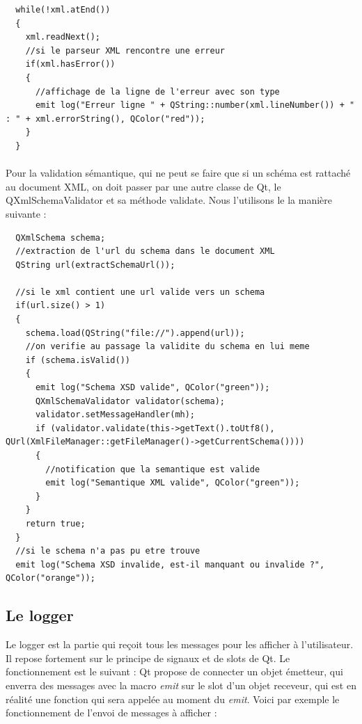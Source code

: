 \begin{lstlisting}
  while(!xml.atEnd())
  {
    xml.readNext();
    //si le parseur XML rencontre une erreur
    if(xml.hasError())
    {
      //affichage de la ligne de l'erreur avec son type
      emit log("Erreur ligne " + QString::number(xml.lineNumber()) + " : " + xml.errorString(), QColor("red"));
    }
  }
\end{lstlisting}
\paragraph{}
Pour la validation sémantique, qui ne peut se faire que si un schéma est rattaché au document XML, on doit passer par une autre classe de Qt, le QXmlSchemaValidator et sa méthode validate. Nous l'utilisons le la manière suivante :
\begin{lstlisting}
  QXmlSchema schema;
  //extraction de l'url du schema dans le document XML
  QString url(extractSchemaUrl());

  //si le xml contient une url valide vers un schema
  if(url.size() > 1)
  {
    schema.load(QString("file://").append(url));
    //on verifie au passage la validite du schema en lui meme
    if (schema.isValid())
    {
      emit log("Schema XSD valide", QColor("green"));
      QXmlSchemaValidator validator(schema);
      validator.setMessageHandler(mh);
      if (validator.validate(this->getText().toUtf8(), QUrl(XmlFileManager::getFileManager()->getCurrentSchema())))
      {
        //notification que la semantique est valide
        emit log("Semantique XML valide", QColor("green"));
      }
    }
    return true;
  }
  //si le schema n'a pas pu etre trouve
  emit log("Schema XSD invalide, est-il manquant ou invalide ?", QColor("orange"));
\end{lstlisting}
\paragraph{}
\subsection{Le logger}
Le logger est la partie qui reçoit tous les messages pour les afficher à l'utilisateur. Il repose fortement sur le principe de signaux et de slots de Qt. Le fonctionnement est le suivant : Qt propose de connecter un objet émetteur, qui enverra des messages avec la macro \textit{emit} sur le slot d'un objet receveur, qui est en réalité une fonction qui sera appelée au moment du \textit{emit}. Voici par exemple le fonctionnement de l'envoi de messages à afficher :

